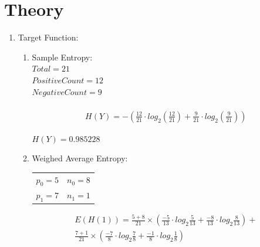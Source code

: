 \documentclass[12pt]{article}
\begin{document}
	
	\maketitle
	
	\section{Theory}
	
	\begin{enumerate}
		\item Target Function:
		
		
		\begin{enumerate}
			
			\item Sample Entropy:\\
			

				$Total = 21$\\ 
				$Positive Count = 12$\\  
				$Negative Count = 9$   \\\\
				
				\begin{equation}
					\begin{split}
						H(Y) = -(\frac{12}{21} \cdot log_2 (\frac{12}{21}) + \frac{9}{21} \cdot log_2 (\frac{9}{21}))
					\end{split}
				\end{equation}
				
				$H(Y) = 0.985228$\\

			
			\item Weighed Average Entropy:\\
			
			\begin{tabular}{ c c}
				$p_0 = 5$ & $n_0 = 8$\\ 
				$p_1 = 7$ & $n_1 = 1$ 
			\end{tabular}
			
			
			\begin{equation}
				\begin{split}
					E(H(1)) = \frac {5+8}{21} \times (\frac{-5}{13} \cdot log_2 \frac{5}{13} + \frac{-8}{13} \cdot log_2 \frac{8}{13}) +\\
					\frac {7+1}{21} \times (\frac{-7}{8} \cdot log_2 \frac{7}{8} + \frac{-1}{8} \cdot log_2 \frac{1}{8})
				\end{split}
			\end{equation}
			

\end{enumerate}
\end{enumerate}
\end{document}
